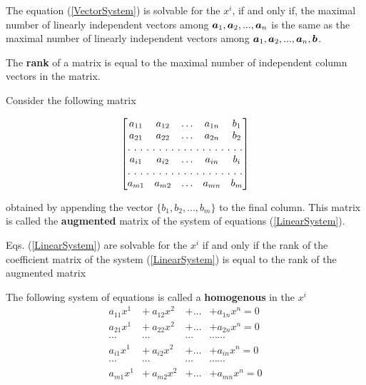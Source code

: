 \begin{theorem}
The equation (\ref{VectorSystem}) is solvable for the $x^i$, if and only if, the maximal number of linearly independent vectors among $\boldsymbol{a}_1, \boldsymbol{a}_2, ..., \boldsymbol{a}_n$ is the same as the maximal number of linearly independent 
vectors among $\boldsymbol{a}_1, \boldsymbol{a}_2, ..., \boldsymbol{a}_n, \boldsymbol{b}$.
\end{theorem}

\begin{definition}
The {\bf rank} of a matrix is equal to the maximal number of independent column vectors in the matrix. \\ 
\end{definition}

Consider the following matrix

\[
\begin{bmatrix}
a_{11} & a_{12}  & \hdots & a_{1n}  & b_1\\
a_{21} & a_{22}  & \hdots & a_{2n}  & b_2\\
\hdotsfor[2]{5}\\
a_{i1} & a_{i2}  & \hdots & a_{in}  & b_i \\
\hdotsfor[2]{5}\\
a_{m1} & a_{m2}  & \hdots & a_{mn}  & b_m\\
\end{bmatrix}
\]

obtained by appending the vector $\{b_1, b_2, ..., b_m\}$ to the final column. This matrix is called the {\bf augmented} matrix of the system of equations (\ref{LinearSystem}).

\begin{theorem}
Eqs. (\ref{LinearSystem}) are solvable for the $x^i$ if and only if the rank of the coefficient matrix of the system (\ref{LinearSystem}) is equal to the rank of the augmented matrix
\end{theorem}

The following system of equations is called a {\bf homogenous} {\elevenit in the $x^i$}
\begin{equation}
\begin{array}{cccc}
a_{11}x^1  &+ ~a_{12}x^2   & + \hdots  &+  a_{1n}x^n   = 0 \\
a_{21}x^1  &+ ~ a_{22}x^2   &+ \hdots  &+  a_{2n}x^n   = 0 \\
 \cdots       &\cdots            &\cdots      &\cdots                \cdots \\
a_{i1}x^1   &+  ~a_{i2}x^2    & + \hdots  &+  a_{in}x^n    = 0 \\
 \cdots       &\cdots            &\cdots      &\cdots                 \cdots\\
a_{m1}x^1 &+  ~a_{m2}x^2 & + \hdots  & +  a_{mn}x^n = 0 \\
\end{array}
\label{HomogenousSystem}
\end{equation}

